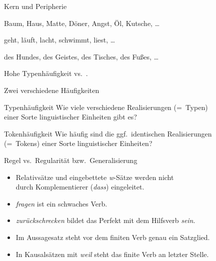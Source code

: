 \begin{frame}
  {Kern und Peripherie}
  \onslide<+->
  \onslide<+->
\begin{exe}
  \ex\label{ex:kernundperipherie022}
    \begin{xlist}
      \ex \alert{Baum, Haus, Matte, Döner, Angst, Öl, Kutsche, \ldots}
      \ex {}
    \end{xlist}
    \onslide<+->
    \ex
    \begin{xlist}
      \ex \alert{geht, läuft, lacht, schwimmt, liest, \ldots}
      \ex {}
    \end{xlist}
    \onslide<+->
    \ex
    \begin{xlist}
      \ex \alert{des Hundes, des Geistes, des Tisches, des Fußes, \ldots}
      \ex {}
    \end{xlist}
  \end{exe}
  \onslide<+->
  \Zeile
  \Large
  \centering
  \alert{Hohe Typenhäufigkeit} vs.\ .  
\end{frame}

\begin{frame}
  {Zwei verschiedene Häufigkeiten}
  \onslide<+->
  \onslide<+->
  \Large\begin{block}{Typenhäufigkeit}
    Wie viele \alert{verschiedene} Realisierungen (=~Typen)\\
    einer Sorte linguistischer Einheiten gibt es?
  \end{block}

  \onslide<+->
  \Zeile
  
  \begin{block}{Tokenhäufigkeit}
    Wie häufig sind die \alert{ggf.\ identischen} Realisierungen\\
    (=~Tokens) einer Sorte linguistischer Einheiten?
  \end{block}
\end{frame}

\begin{frame}
  {Regel vs.\ Regularität bzw.\ Generalisierung}
  \onslide<+->
  \begin{itemize}[<+->]
    \item Relativsätze und eingebettete \textit{w}-Sätze werden nicht\\
      durch Komplementierer (\textit{dass}) eingeleitet.
      \Viertelzeile
    \item \textit{fragen} ist ein schwaches Verb.
      \Viertelzeile
    \item \textit{zurückschrecken} bildet das Perfekt mit dem Hilfsverb \textit{sein}.
      \Viertelzeile
    \item Im Aussagesatz steht vor dem finiten Verb genau ein Satzglied.
      \Viertelzeile
    \item In Kausalsätzen mit \textit{weil} steht das finite Verb an letzter Stelle.
  \end{itemize}
\end{frame}


